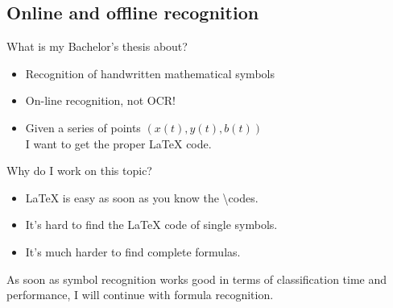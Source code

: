 \subsection{Online and offline recognition}

\begin{frame}{What is my Bachelor's thesis about?}
    \begin{itemize}
        \item Recognition of handwritten mathematical symbols
        \item On-line recognition, not OCR!
        \item Given a series of points $(x(t), y(t), b(t))$\\
              I want to get the proper \LaTeX{} code.
    \end{itemize}
\end{frame}

\begin{frame}{Why do I work on this topic?}
    \begin{itemize}
        \item \LaTeX{} is easy as soon as you know the \textbackslash{}codes.
        \item It's hard to find the \LaTeX{} code of single symbols.
        \item It's much harder to find complete formulas.
    \end{itemize}


    As soon as symbol recognition works good in terms of classification time and
    performance, I will continue with formula recognition.
\end{frame}